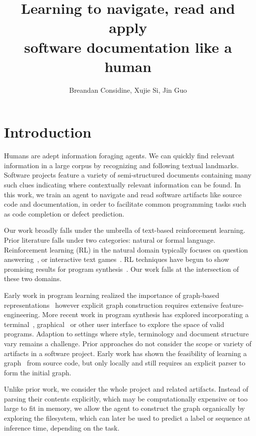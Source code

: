 \documentclass[11pt]{article}
\title{Learning to navigate, read and apply\\software documentation like a human}
\author{Breandan Considine, Xujie Si, Jin Guo}
\begin{document}
\maketitle

\section{Introduction}

Humans are adept information foraging agents. We can quickly find relevant information in a large corpus by recognizing and following textual landmarks. Software projects feature a variety of semi-structured documents containing many such clues indicating where contextually relevant information can be found. In this work, we train an agent to navigate and read software artifacts like source code and documentation, in order to facilitate common programming tasks such as code completion or defect prediction.

Our work broadly falls under the umbrella of text-based reinforcement learning. Prior literature falls under two categories: natural or formal language. Reinforcement learning (RL) in the natural domain typically focuses on question answering~\cite{buck2017ask, chen2019reinforcement}, or interactive text games~\cite{he2015deep,ammanabrolu2018playing,narasimhan2015language,guo2020interactive,ammanabrolu2020graph}. RL techniques have begun to show promising results for program synthesis~\cite{ellis2019write, johnson2020learning, chen2020program}. Our work falls at the intersection of these two domains.

Early work in program learning realized the importance of graph-based representations~\cite{allamanis2017learning} however explicit graph construction requires extensive feature-engineering. More recent work in program synthesis has explored incorporating a terminal~\cite{ellis2019write}, graphical~\cite{walke2020learning} or other user interface to explore the space of valid programs. Adaption to settings where style, terminology and document structure vary remains a challenge. Prior approaches do not consider the scope or variety of artifacts in a software project. Early work has shown the feasibility of learning a graph~\cite{johnson2020learning} from source code, but only locally and still requires an explicit parser to form the initial graph.

Unlike prior work, we consider the whole project and related artifacts. Instead of parsing their contents explicitly, which may be computationally expensive or too large to fit in memory, we allow the agent to construct the graph organically by exploring the filesystem, which can later be used to predict a label or sequence at inference time, depending on the task.
\end{document}
